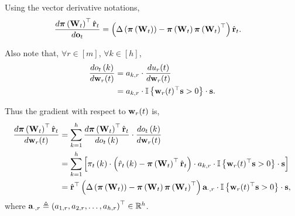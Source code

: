 \noindent Using the vector derivative notations,
\begin{equation*}
\begin{split}
    \frac{d {\boldsymbol{\pi}}\left( {\mathbf{W}}_t \right)^\top \hat{{\mathbf{r}}}_t}{d {\mathbf{o}}_t} &= \left( \Delta\left( {\boldsymbol{\pi}}\left({\mathbf{W}}_t\right) \right) - {\boldsymbol{\pi}}\left({\mathbf{W}}_t\right) {\boldsymbol{\pi}}\left({\mathbf{W}}_t\right)^\top \right) \hat{{\mathbf{r}}}_t.
\end{split}
\end{equation*}

\noindent Also note that, $\forall r \in [m]$, $\forall k \in [h]$,
\begin{equation*}
\begin{split}
    \frac{d o_t\left(k\right)}{d {\mathbf{w}}_r(t)} &= a_{k,r} \cdot \frac{d u_{r}(t)}{d {\mathbf{w}}_r(t)} \\
    &= a_{k,r} \cdot {\mathbb{I}}\left\{ {\mathbf{w}}_r(t)^\top {\mathbf{s}} > 0 \right\} \cdot {\mathbf{s}}.
\end{split}
\end{equation*}

\noindent Thus the gradient with respect to ${\mathbf{w}}_r(t)$ is,
\begin{equation*}
\label{eq:gradient_form_two}
\begin{split}
    \frac{d {\boldsymbol{\pi}}\left( {\mathbf{W}}_t \right)^\top \hat{{\mathbf{r}}}_t}{d {\mathbf{w}}_r(t)} &=  \sum\limits_{k=1}^{h}{ \frac{d {\boldsymbol{\pi}}\left( {\mathbf{W}}_t \right)^\top \hat{{\mathbf{r}}}_t}{d o_t\left(k\right)} \cdot \frac{d o_t\left(k\right)}{d {\mathbf{w}}_r(t)} }  \\
    &= \sum\limits_{k=1}^{h}{ \left[ \pi_t\left(k\right) \cdot \left( \hat{r}_{t}\left(k\right) - {\boldsymbol{\pi}}\left({\mathbf{W}}_t\right)^\top \hat{{\mathbf{r}}}_t \right) \cdot a_{k,r} \cdot {\mathbb{I}}\left\{ {\mathbf{w}}_r(t)^\top {\mathbf{s}} > 0 \right\} \cdot {\mathbf{s}}  \right] } \\
    &= \hat{{\mathbf{r}}}^\top \left( \Delta\left( {\boldsymbol{\pi}}\left({\mathbf{W}}_t\right) \right) - {\boldsymbol{\pi}}\left({\mathbf{W}}_t\right) {\boldsymbol{\pi}}\left({\mathbf{W}}_t\right)^\top \right) {\mathbf{a}}_{\cdot, r} \cdot {\mathbb{I}}\left\{ {\mathbf{w}}_r(t)^\top {\mathbf{s}} > 0 \right\} \cdot {\mathbf{s}},
\end{split}
\end{equation*}
where ${\mathbf{a}}_{\cdot, r} \triangleq \left( a_{1,r}, a_{2,r}, \dots, a_{h,r} \right)^\top \in {\mathbb{R}}^h$.
